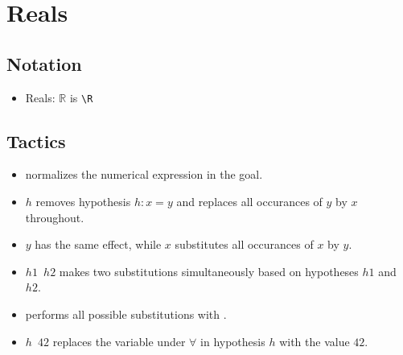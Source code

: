 \documentclass[a4paper]{article}
\newcommand{\R}{\mathbb{R}}
\begin{document}
\section{Reals}

\subsection*{Notation}

\begin{itemize}
    \item Reals: $\R$ is \verb|\R|
\end{itemize}

\subsection*{Tactics}


\begin{itemize}
    \item \normnum normalizes the numerical expression in the goal.
\end{itemize}


\begin{itemize}
    \item \texttt{\subst $h$} removes hypothesis $h : x = y$ and replaces all occurances of $y$ by $x$ throughout.
    \item \texttt{\subst $y$} has the same effect, while \texttt{\subst $x$} substitutes all occurances of $x$ by $y$.
    \item \texttt{\subst $h1$ $h2$} makes two substitutions simultaneously based on hypotheses $h1$ and $h2$.
\end{itemize}


\begin{itemize}
    \item \substvars performs all possible substitutions with \subst.
\end{itemize}


\begin{itemize}
    \item \texttt{\specialize $h$ $42$} replaces the variable under $\forall$ in hypothesis $h$ with the value $42$.
\end{itemize}
\end{document}
